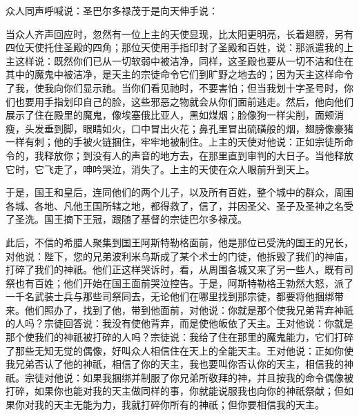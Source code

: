 众人同声呼喊说：圣巴尔多禄茂于是向天伸手说：\par

当众人齐声回应时，忽然有一位上主的天使显现，比太阳更明亮，长着翅膀，另有四位天使托住圣殿的四角；那位天使用手指印封了圣殿和百姓，说：那派遣我的上主这样说：既然你们已从一切软弱中被洁净，同样，这圣殿也要从一切不洁和住在其中的魔鬼中被洁净，是天主的宗徒命令它们到旷野之地去的；因为天主这样命令了我，使我向你们显示祂。当你们看见祂时，不要害怕；但当我划十字圣号时，你们也要用手指划印自己的脸，这些邪恶之物就会从你们面前逃走。然后，他向他们展示了住在殿里的魔鬼，像埃塞俄比亚人，黑如煤烟；脸像狗一样尖削，面颊消瘦，头发垂到脚，眼睛如火，口中冒出火花；鼻孔里冒出硫磺般的烟，翅膀像豪猪一样有刺；他的手被火链捆住，牢牢地被制住。上主的天使对他说：正如宗徒所命令的，我释放你；到没有人的声音的地方去，在那里直到审判的大日子。当他释放它时，它飞走了，呻吟哭泣，消失了。上主的天使在众人眼前升到天上。\par

于是，国王和皇后，连同他们的两个儿子，以及所有百姓，整个城中的群众，周围各城、各地、凡他王国所辖之地，都得救了，信了，并因圣父、圣子及圣神之名受了圣洗。国王摘下王冠，跟随了基督的宗徒巴尔多禄茂。\par

此后，不信的希腊人聚集到国王阿斯特勒格面前，他是那位已受洗的国王的兄长，对他说：陛下，您的兄弟波利米乌斯成了某个术士的门徒，他拆毁了我们的神庙，打碎了我们的神祇。他们正这样哭诉时，看，从周围各城又来了另一些人，既有司祭也有百姓；他们开始在国王面前哭泣控告。于是，阿斯特勒格王勃然大怒，派了一千名武装士兵与那些司祭同去，无论他们在哪里找到那宗徒，都要将他捆绑带来。他们照办了，找到了他，带到他面前，对他说：你就是那个使我兄弟背弃神祇的人吗？宗徒回答说：我没有使他背弃，而是使他皈依了天主。王对他说：你就是那个使我们的神祇被打碎的人吗？宗徒说：我给了住在那里的魔鬼能力，它们打碎了那些无知无觉的偶像，好叫众人相信住在天上的全能天主。王对他说：正如你使我兄弟否认了他的神祇，相信了你的天主，我也要叫你否认你的天主，相信我的神祇。宗徒对他说：如果我捆绑并制服了你兄弟所敬拜的神，并且按我的命令偶像被打碎，如果你也能对我的天主做同样的事，你就能说服我也向你的神祇祭献；但如果你对我的天主无能为力，我就打碎你所有的神祇；但你要相信我的天主。\par


